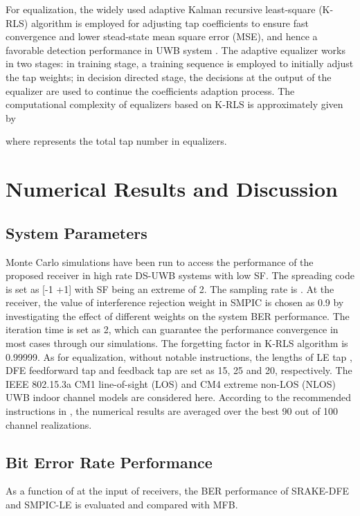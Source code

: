 \documentclass[journal]{IEEEtran}
\begin{document}
For equalization, the widely used adaptive Kalman recursive
least-square (K-RLS) algorithm is employed for adjusting tap
coefficients to ensure fast convergence and lower stead-state mean
square error (MSE), and hence a favorable detection performance in
UWB system \cite{RLS_advan}. The adaptive equalizer works in two
stages: in training stage, a training sequence is employed to
initially adjust the tap weights; in decision directed stage, the
decisions at the output of the equalizer are used to continue the
coefficients adaption process. The computational complexity of
equalizers based on K-RLS is approximately given by \cite{Proakis}

where  represents the total tap number in equalizers.


\section{Numerical Results and Discussion}

\subsection{System Parameters}
Monte Carlo simulations have been run to access the performance of
the proposed receiver in high rate DS-UWB systems with low SF. The
spreading code is set as [-1 +1] with SF being an extreme of 2. The
sampling rate is . At the receiver, the value of interference
rejection weight  in SMPIC is chosen as 0.9 by investigating the
effect of different weights on the system BER performance. The
iteration time  is set as 2, which can guarantee the performance
convergence in most cases through our simulations. The forgetting
factor in K-RLS algorithm is 0.99999. As for equalization, without
notable instructions, the lengths of LE tap , DFE feedforward tap
 and feedback tap  are set as 15, 25 and 20, respectively.
The IEEE 802.15.3a CM1 line-of-sight (LOS) and CM4 extreme non-LOS
(NLOS) UWB indoor channel models are considered here. According to
the recommended instructions in \cite{Channel}, the numerical
results are averaged over the best 90 out of 100 channel
realizations.




\subsection{Bit Error Rate Performance}

As a function of  at the input of receivers, the BER
performance of SRAKE-DFE and SMPIC-LE is evaluated and compared with
MFB.
\end{document}
